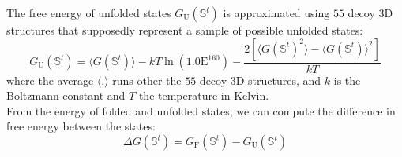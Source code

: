 \documentclass{article}
\newcommand{\phenoFold}{\Delta G}
\begin{document}
The free energy of unfolded states $G_{\mathrm{U}}\left(\mathbb{S}^{t}\right)$ is approximated using $55$ decoy $3$D structures that supposedly represent a sample of possible unfolded states:
\begin{equation}
G_{\mathrm{U}}\left(\mathbb{S}^{t}\right) = \langle G\left(\mathbb{S}^{t}\right) \rangle - kT \ln (1.0\mathrm{E}^{160}) - \dfrac{2 \left[ \langle G\left(\mathbb{S}^{t}\right)^2 \rangle - \langle G\left(\mathbb{S}^{t}\right) \rangle^2\right] }{kT}
\end{equation}
where the average $\langle . \rangle$ runs other the $55$ decoy $3$D structures, and $k$ is the Boltzmann constant and $T$ the temperature in Kelvin.\\

From the energy of folded and unfolded states, we can compute the difference in free energy between the states:
\begin{equation}
\phenoFold\left(\mathbb{S}^{t}\right) = G_{\mathrm{F}}\left(\mathbb{S}^{t}\right) - G_{\mathrm{U}}\left(\mathbb{S}^{t}\right)
\end{equation}
\end{document}
